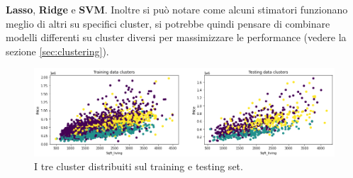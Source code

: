 \documentclass{article}
\begin{document}
\textbf{Lasso}, \textbf{Ridge} e \textbf{SVM}. Inoltre si può notare come
alcuni stimatori funzionano meglio di altri su specifici cluster, si potrebbe
quindi pensare di combinare modelli differenti su cluster diversi per
massimizzare le performance (vedere la sezione \ref{sec:clustering}).
\begin{figure}[ht]
	\centering
	\includegraphics[width=\textwidth]{clustereq.png}
	\caption{I tre cluster distribuiti sul training e testing set.}
\end{figure}
\end{document}

